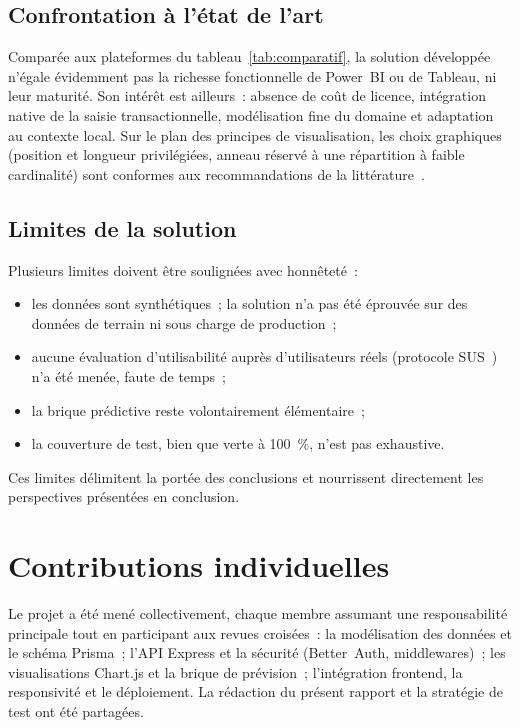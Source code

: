 \documentclass[11pt,a4paper]{report}
\begin{document}
\subsection{Confrontation à l'état de l'art}
Comparée aux plateformes du tableau~\ref{tab:comparatif}, la solution développée
n'égale évidemment pas la richesse fonctionnelle de Power~BI ou de Tableau, ni
leur maturité. Son intérêt est ailleurs~: absence de coût de licence, intégration
native de la saisie transactionnelle, modélisation fine du domaine et adaptation
au contexte local. Sur le plan des principes de visualisation, les choix
graphiques (position et longueur privilégiées, anneau réservé à une répartition
à faible cardinalité) sont conformes aux recommandations de la
littérature~\cite{cleveland1984graphical,tufte2001visual}.

\subsection{Limites de la solution}
Plusieurs limites doivent être soulignées avec honnêteté~:
\begin{itemize}
  \item les données sont synthétiques~; la solution n'a pas été éprouvée sur des
        données de terrain ni sous charge de production~;
  \item aucune évaluation d'utilisabilité auprès d'utilisateurs réels (protocole
        SUS~\cite{brooke1996sus}) n'a été menée, faute de temps~;
  \item la brique prédictive reste volontairement élémentaire~;
  \item la couverture de test, bien que verte à 100~\%, n'est pas exhaustive.
\end{itemize}
Ces limites délimitent la portée des conclusions et nourrissent directement les
perspectives présentées en conclusion.

\section{Contributions individuelles}
Le projet a été mené collectivement, chaque membre assumant une responsabilité
principale tout en participant aux revues croisées~: la modélisation des données
et le schéma Prisma~; l'API Express et la sécurité (Better~Auth, middlewares)~;
les visualisations Chart.js et la brique de prévision~; l'intégration frontend,
la responsivité et le déploiement. La rédaction du présent rapport et la
stratégie de test ont été partagées.
\end{document}
